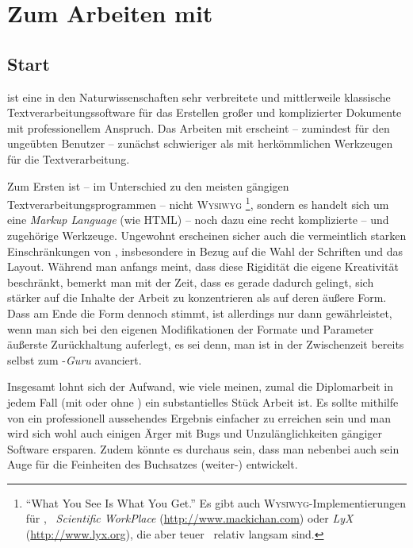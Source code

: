 \chapter{Zum Arbeiten mit \latex}
\label{cha:ArbeitenMitLatex}



\section{Start}
\label{sec:latex}



\latex ist eine in den Naturwissenschaften sehr verbreitete
und mittlerweile klassische Textverarbeitungssoftware für das Erstellen
großer und komplizierter Dokumente mit professionellem Anspruch.
Das Arbeiten mit \latex erscheint -- zumindest für den ungeübten Benutzer -- %
zunächst schwieriger als mit herkömmlichen Werkzeugen für die
Textverarbeitung.

Zum Ersten ist -- im Unterschied zu den meisten gängigen
Text\-ver\-arbei\-tungs\-prog\-ram\-men -- \latex nicht \textsc{Wysiwyg}%
\footnote{"`What You See Is What You Get."' Es gibt auch 
\textsc{Wysiwyg}-Implementierungen für \latex, 
\zB\ \emph{Scientific WorkPlace} (\url{http://www.mackichan.com}) oder
\emph{LyX} (\url{http://www.lyx.org}), 
die aber teuer \bzw\ relativ langsam sind.},
sondern es handelt sich um eine \emph{Markup Lang\-uage} (wie HTML) -- noch dazu
eine recht komplizierte -- und zugehörige Werkzeuge.
Ungewohnt erscheinen sicher auch die vermeintlich starken
Einschränkungen von \latex,
insbesondere in Bezug auf die Wahl der Schriften und das
Layout. Während man anfangs meint, dass diese Rigidität
die eigene Kreativität beschränkt, bemerkt man mit der Zeit, dass es gerade
dadurch gelingt, sich stärker auf die Inhalte der Arbeit zu
konzentrieren als auf deren äußere Form. Dass am Ende die Form dennoch stimmt,
ist allerdings nur dann gewährleistet, wenn man sich bei den eigenen Modifikationen
der Formate und Parameter äußerste Zurückhaltung auferlegt, es sei denn,
man ist in der Zwischenzeit bereits selbst zum \latex-\emph{Guru} avanciert.

Insgesamt lohnt sich der Aufwand, wie viele meinen, zumal die Diplomarbeit
in jedem Fall (mit oder ohne \latex) ein substantielles Stück Arbeit ist.
Es sollte mithilfe von \latex ein professionell aussehendes
Ergebnis einfacher zu erreichen sein und man wird sich wohl auch einigen
Ärger mit Bugs und Unzulänglichkeiten gängiger Software ersparen.
Zudem könnte es durchaus sein, dass man nebenbei auch sein Auge für
die Feinheiten des Buchsatzes (weiter-) entwickelt.

